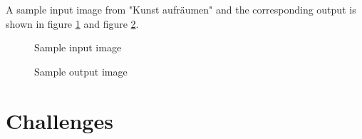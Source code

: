 \documentclass[a4paper,10pt,hidelinks]{scrartcl}
\newcommand{\imgref}[1]{{figure \ref{#1}}}
\begin{document}
A sample input image from "Kunst aufräumen" and the corresponding output is shown in \imgref{fig:input-image} and \imgref{fig:output-image}.

\begin{figure}[!h]
	\caption{\label{fig:input-image} Sample input image}
\end{figure}

\begin{figure}[!h]
	\caption{\label{fig:output-image} Sample output image}
\end{figure}

\section{\fontsize{14}{16}\selectfont Challenges}
\end{document}
